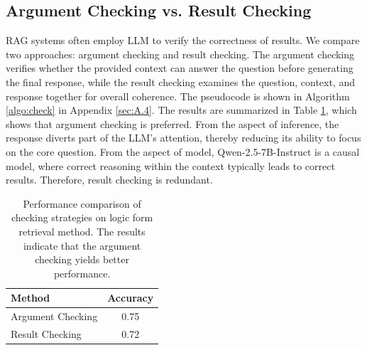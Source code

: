 \documentclass[11pt]{article}
\begin{document}

\subsection{Argument Checking vs. Result Checking}
RAG systems often employ LLM to verify the correctness of results. We compare two approaches: argument checking and result checking. The argument checking verifies whether the provided context can answer the question before generating the final response, while the result checking examines the question, context, and response together for overall coherence. The pseudocode is shown in Algorithm \ref{algo:check} in Appendix \ref{sec:A.4}. The results are summarized in Table \ref{tab:check}, which shows that argument checking is preferred. From the aspect of inference, the response diverts part of the LLM's attention, thereby reducing its ability to focus on the core question. From the aspect of model, Qwen-2.5-7B-Instruct is a causal model, where correct reasoning within the context typically leads to correct results. Therefore, result checking is redundant.

\begin{table}[t]
\centering
\begin{tabular}{lc}
\hline
\textbf{Method} & \textbf{Accuracy} \\\hline
Argument Checking & 0.75 \\
Result Checking & 0.72 \\\hline 
\end{tabular}
\caption{Performance comparison of checking strategies on logic form retrieval method. The results indicate that the argument checking yields better performance.}
\label{tab:check}
\end{table}


\end{document}
